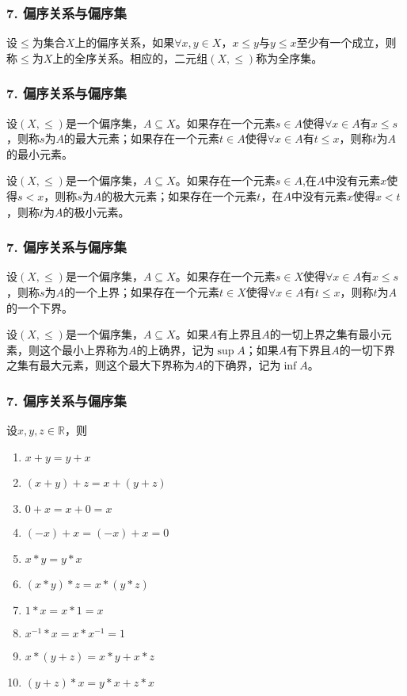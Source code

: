 \documentclass{beamer}
\begin{document}
\begin{CJK*}{UTF8}{gbsn}
\begin{frame}
\frametitle{7. 偏序关系与偏序集}
  \begin{Def}\justifying\let\raggedright\justifying
    设$\leq$为集合$X$上的偏序关系，如果$\forall x, y \in X$，$x \leq y$与$y \leq x$至少有一个成立，则称$\leq$为$X$上的\alert{全序关系}。相应的，二元组$(X,\leq)$称为\alert{全序集}。
  \end{Def}
\end{frame}
\begin{frame}
  \frametitle{7. 偏序关系与偏序集}
  \begin{Def}
    设$(X,\leq)$是一个偏序集，$A\subseteq X$。如果存在一个元素$s\in A$使得$\forall x \in A$有$x \leq s$，则称$s$为$A$的\alert{最大元素}；如果存在一个元素$t\in A$使得$\forall x \in A$有$t \leq x$，则称$t$为$A$的\alert{最小元素}。
  \end{Def}
    \begin{Def}
    设$(X,\leq)$是一个偏序集，$A\subseteq X$。如果存在一个元素$s\in A$,在$A$中没有元素$x$使得$s < x$，则称$s$为$A$的\alert{极大元素}；如果存在一个元素$t$，在$A$中没有元素$x$使得$x < t$，则称$t$为$A$的\alert{极小元素}。
  \end{Def}
\end{frame}
\begin{frame}
  \frametitle{7. 偏序关系与偏序集}
  \begin{Def}
    设$(X,\leq)$是一个偏序集，$A\subseteq X$。如果存在一个元素$s\in X$使得$\forall x \in A$有$x \leq s$，则称$s$为$A$的一个\alert{上界}；如果存在一个元素$t\in X$使得$\forall x \in A$有$t \leq x$，则称$t$为$A$的一个\alert{下界}。
  \end{Def}
    \begin{Def}
      设$(X,\leq)$是一个偏序集，$A\subseteq X$。如果$A$有上界且$A$的一切上界之集有最小元素，则这个最小上界称为$A$的\alert{上确界}，记为$\sup A$；如果$A$有下界且$A$的一切下界之集有最大元素，则这个最大下界称为$A$的\alert{下确界}，记为$\inf A$。
  \end{Def}
\end{frame}

\begin{frame}
  \frametitle{7. 偏序关系与偏序集}
   设$x, y, z \in \mathbb{R}$，则
   \begin{enumerate}
   \item   $x + y = y + x$
   \item   $(x + y) + z = x + (y + z)$
   \item   $0 + x = x + 0 = x$
   \item   $(-x) + x = (-x) + x = 0$
   \item   $x * y = y * x$
   \item   $(x * y) * z = x * (y *z)$
   \item   $1 * x = x * 1 = x$
   \item   $x^{-1} * x = x * x^{-1} = 1$
   \item   $x* (y + z) = x * y + x * z$
   \item   $(y + z) * x = y * x + z * x$
   

\end{enumerate}
\end{frame}
\end{CJK*}
\end{document}
